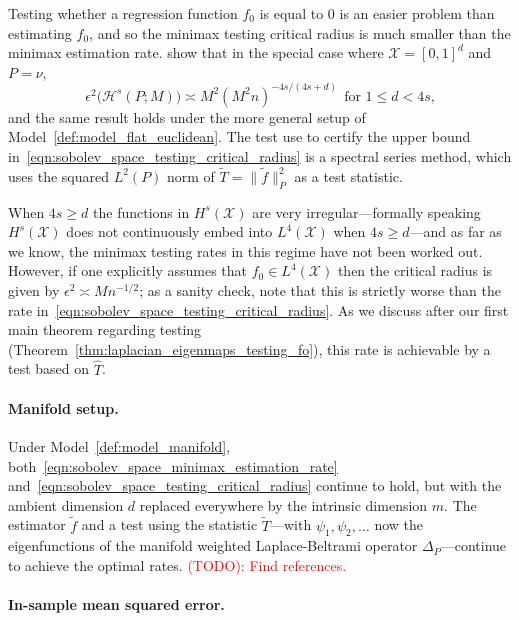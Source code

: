 \documentclass{article}
\newcommand{\1}{\mathbf{1}}
\newcommand{\Xset}{\mathcal{X}}
\newcommand{\Leb}{L}
\newcommand{\mc}[1]{\mathcal{#1}}
\newcommand{\wt}[1]{\widetilde{#1}}
\newcommand{\wh}[1]{\widehat{#1}}
\theoremstyle{alden}
\theoremstyle{aldenthm}
\theoremstyle{definition}
\theoremstyle{remark}
\begin{document}
Testing whether a regression function $f_0$ is equal to $0$ is an easier problem than estimating $f_0$, and so the minimax testing critical radius is much smaller than the minimax estimation rate. \citet{ingster2009} show that in the special case where $\mc{X} = [0,1]^d$ and $P = \nu$,
\begin{equation}
\label{eqn:sobolev_space_testing_critical_radius}
\epsilon^2\bigl(\mc{H}^s(P;M)\bigr) \asymp M^2(M^2n)^{-4s/(4s + d)}~~\textrm{for $1 \leq d < 4s$,}
\end{equation}
and the same result holds under the more general setup of Model~\ref{def:model_flat_euclidean}. The test \citet{ingster2009} use to certify the upper bound in~\eqref{eqn:sobolev_space_testing_critical_radius} is a spectral series method, which uses the squared $L^2(P)$ norm of $\wt{T} = \|\wt{f}\|_{P}^2$ as a test statistic. 

When $4s \geq d$ the functions in $H^s(\Xset)$ are very irregular---formally speaking $H^s(\Xset)$ does not continuously embed into $\Leb^4(\Xset)$ when $4s \geq d$---and as far as we know, the minimax testing rates in this regime have not been worked out. However, if one explicitly assumes that $f_0 \in \Leb^4(\mc{X})$ then the critical radius is given by $\epsilon^2 \asymp Mn^{-1/2}$; as a sanity check, note that this is strictly worse than the rate in~\eqref{eqn:sobolev_space_testing_critical_radius}. As we discuss after our first main theorem regarding testing (Theorem~\ref{thm:laplacian_eigenmaps_testing_fo}), this rate is achievable by a test based on $\wh{T}$.

\paragraph{Manifold setup.}
Under Model~\ref{def:model_manifold}, both~\eqref{eqn:sobolev_space_minimax_estimation_rate} and~\eqref{eqn:sobolev_space_testing_critical_radius} continue to hold, but with the ambient dimension $d$ replaced everywhere by the intrinsic dimension $m$. The estimator $\wt{f}$ and a test using the statistic $\wt{T}$---with $\psi_1,\psi_2,\ldots$ now the eigenfunctions of the manifold weighted Laplace-Beltrami operator $\Delta_P$---continue to achieve the optimal rates. \textcolor{red}{(TODO): Find references.}

\paragraph{In-sample mean squared error.}
\end{document}
